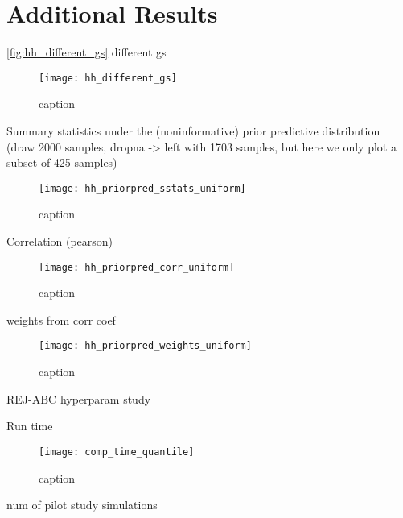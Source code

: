 \chapter{Additional Results}\label{sec:Appendix A}

\autoref{fig:hh_different_gs} different gs

\begin{figure}[H]
    \centering
    \texttt{[image: hh\_different\_gs]}
    \caption{caption
    }
    \label{fig:hh_different_gs}
\end{figure}

Summary statistics under the (noninformative) prior predictive distribution (draw 2000 samples, dropna -> left with 1703 samples, but here we only plot a subset of 425 samples)

\begin{figure}[H]
    \centering
    \texttt{[image: hh\_priorpred\_sstats\_uniform]}
    \caption{caption}
    \label{fig:fig1}
\end{figure} 


Correlation (pearson) 

\begin{figure}[H]
    \centering
    \texttt{[image: hh\_priorpred\_corr\_uniform]}
    \caption{caption}
    \label{fig:fig1}
\end{figure} 

weights from corr coef

\begin{figure}[H]
    \centering
    \texttt{[image: hh\_priorpred\_weights\_uniform]}
    \caption{caption}
    \label{fig:fig1}
\end{figure} 

 
REJ-ABC hyperparam study 

Run time

\begin{figure}[H]
    \centering
    \texttt{[image: comp\_time\_quantile]}
    \caption{caption}
    \label{fig:fig1}
\end{figure}

num of pilot study simulations 

